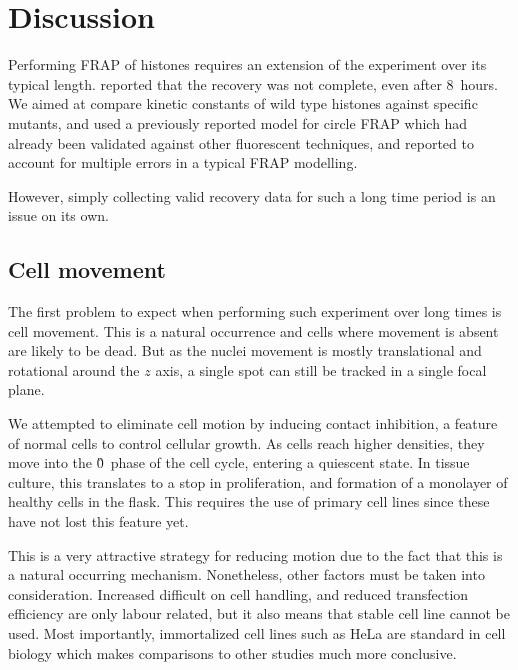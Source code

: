 \section{Discussion}

  Performing FRAP of histones requires an extension of the experiment over
  its typical length. \cite{KimuraCook}
  reported that the recovery was not complete, even after 8~hours.
  We aimed at compare kinetic constants of wild type histones against
  specific mutants, and used a previously reported model for circle FRAP
  which had already been validated against other fluorescent techniques,
  and reported to account for multiple errors in a typical FRAP modelling.

  However, simply collecting valid recovery data for such a long time
  period is an issue on its own.

  \subsection{Cell movement}

    The first problem to expect when performing such experiment over
    long times is cell movement. This is a natural occurrence and cells
    where movement is absent are likely to be dead. But as the nuclei
    movement is mostly translational and rotational around the $z$ axis,
    a single spot can still be tracked in a single focal plane.

    \label{sec:kill-frap:discuss-contact-inhibition}

    We attempted to eliminate cell motion by inducing contact inhibition,
    a feature of normal cells to control cellular growth. As cells reach
    higher densities, they move into the \G0{}~phase of the cell cycle,
    entering a quiescent state. In tissue culture,
    this translates to a stop in proliferation, and formation of a monolayer
    of healthy cells in the flask. This requires the use of primary
    cell lines since these have not lost this feature yet.

    This is a very attractive strategy for reducing motion due to the
    fact that this is a natural occurring mechanism. Nonetheless,
    other factors must be taken into consideration.
    Increased difficult on cell handling, and reduced
    transfection efficiency are only labour related, but it also means
    that stable cell line cannot be used. Most importantly, immortalized
    cell lines such as HeLa are standard in cell biology which makes
    comparisons to other studies much more conclusive.

